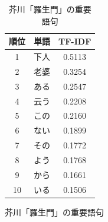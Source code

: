 \documentclass[a4paper,11pt]{ltjsarticle}
\begin{document}
\begin{figure}
    \begin{table}[H]
        \centering
        \caption{芥川「羅生門」の重要語句}
        \begin{tabular}{ccc}
            \hline
            \hline
            順位 & 単語 & TF-IDF \\
            \hline
            1  & 下人 & 0.5113 \\
            2  & 老婆 & 0.3254 \\
            3  & ある & 0.2547 \\
            4  & 云う & 0.2208 \\
            5  & この & 0.2160 \\
            6  & ない & 0.1899 \\
            7  & その & 0.1772 \\
            8  & よう & 0.1768 \\
            9  & から & 0.1661 \\
            10 & いる & 0.1506 \\
            \hline
        \end{tabular}
        \label{tab:sample}
    \end{table}
\end{figure}
\end{document}

